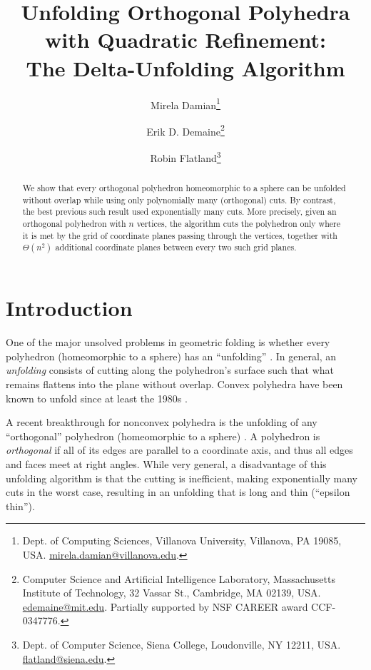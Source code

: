 \documentclass[11pt]{article}
\begin{document}
\title{Unfolding Orthogonal Polyhedra with Quadratic Refinement:\\
The Delta-Unfolding Algorithm}
\author{Mirela Damian\thanks{Dept. of Computing Sciences, Villanova University, Villanova,
    PA 19085, USA.
   \protect\url{mirela.damian@villanova.edu}.}
\and
Erik D. Demaine\thanks{Computer Science and Artificial Intelligence Laboratory,
       Massachusetts Institute of Technology,
       32 Vassar St., Cambridge, MA 02139, USA. \protect\url{edemaine@mit.edu}.
       Partially supported by NSF CAREER award CCF-0347776.}
\and
Robin Flatland\thanks{Dept. of Computer Science, Siena College, Loudonville, NY 12211, USA.
    \protect\url{flatland@siena.edu}.}
}

\date{}
\maketitle

\begin{abstract}
  We show that every orthogonal polyhedron homeomorphic to a sphere can be
  unfolded without overlap while using only polynomially many (orthogonal) cuts.
  By contrast, the best previous such result used exponentially many cuts.
  More precisely, given an orthogonal polyhedron with $n$ vertices,
  the algorithm cuts the polyhedron only where it is met by
  the grid of coordinate planes passing through the vertices,
  together with $\Theta(n^2)$ additional coordinate planes
  between every two such grid planes.
\end{abstract}

\section{Introduction}

One of the major unsolved problems in geometric folding is whether every
polyhedron (homeomorphic to a sphere) has an ``unfolding''
\cite{Bern-Demaine-Eppstein-Kuo-Mantler-Snoeyink-2003,Demaine-O'Rourke-2007}.
In general, an \emph{unfolding} consists of cutting along the polyhedron's
surface such that what remains flattens into the plane without overlap.
Convex polyhedra have been known to unfold
since at least the 1980s \cite[Sec.~24.1.1]{Demaine-O'Rourke-2007}.

A recent breakthrough for nonconvex polyhedra is the unfolding of
any ``orthogonal'' polyhedron (homeomorphic to a sphere)
\cite{Damian-Flatland-O'Rourke-2007-epsilon}.
A polyhedron is \emph{orthogonal} if all of its edges are parallel
to a coordinate axis, and thus all edges and faces meet at right angles.
While very general, a disadvantage of this unfolding algorithm
is that the cutting is inefficient,
making exponentially many cuts in the worst case, 
resulting in an unfolding that is long and thin (``epsilon thin'').
         
\end{document}
